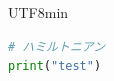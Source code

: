 \documentclass{article}
\begin{document}
\begin{CJK*}{UTF8}{min}

\begin{lstlisting}[language=Python]
# ハミルトニアン
print("test")
\end{lstlisting}

\end{CJK*}
\end{document}
